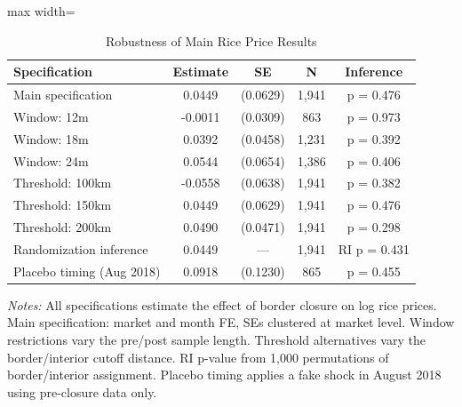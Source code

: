 \begin{table}[H]
\centering
\caption{Robustness of Main Rice Price Results}
\label{tab:robustness}
\begin{threeparttable}
\begin{adjustbox}{max width=\textwidth}
\begin{tabular}{lcccc}
\toprule
Specification & Estimate & SE & N & Inference \\
\midrule
Main specification & 0.0449 & (0.0629) & 1,941 & p = 0.476 \\
Window: 12m & -0.0011 & (0.0309) & 863 & p = 0.973 \\
Window: 18m & 0.0392 & (0.0458) & 1,231 & p = 0.392 \\
Window: 24m & 0.0544 & (0.0654) & 1,386 & p = 0.406 \\
Threshold: 100km & -0.0558 & (0.0638) & 1,941 & p = 0.382 \\
Threshold: 150km & 0.0449 & (0.0629) & 1,941 & p = 0.476 \\
Threshold: 200km & 0.0490 & (0.0471) & 1,941 & p = 0.298 \\
Randomization inference & 0.0449 & --- & 1,941 & RI p = 0.431 \\
Placebo timing (Aug 2018) & 0.0918 & (0.1230) & 865 & p = 0.455 \\
\bottomrule
\end{tabular}
\end{adjustbox}
\begin{tablenotes}[flushleft]
\small
\item \emph{Notes:} All specifications estimate the effect of border closure on log rice prices. Main specification: market and month FE, SEs clustered at market level. Window restrictions vary the pre/post sample length. Threshold alternatives vary the border/interior cutoff distance. RI p-value from 1,000 permutations of border/interior assignment. Placebo timing applies a fake shock in August 2018 using pre-closure data only.
\end{tablenotes}
\end{threeparttable}
\end{table}

